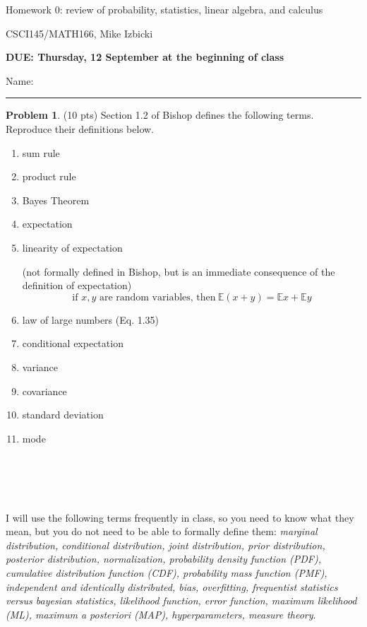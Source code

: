 \documentclass[10pt]{article}
\theoremstyle{definition}
\newtheorem{problem}{Problem}
\newcommand{\E}{\mathbb E}
\begin{document}
\begin{center}
    {
\Large
Homework 0: review of probability, statistics, linear algebra, and calculus
}

    \vspace{0.1in}
CSCI145/MATH166, Mike Izbicki

    \vspace{0.1in}
    \textbf{DUE: Thursday, 12 September at the beginning of class}

    \vspace{0.1in}
\end{center}

\vspace{0.25in}
\noindent
Name: 

\noindent
\rule{\textwidth}{0.1pt}
\vspace{0.25in}

\begin{problem}
    (10 pts)
    Section 1.2 of Bishop defines the following terms.
    Reproduce their definitions below.
    \begin{enumerate}
        \setlength\itemsep{8.0em}
        \item sum rule
        \item product rule
        \item Bayes Theorem
        \item expectation
        \item linearity of expectation 

            (not formally defined in Bishop, but is an immediate consequence of the definition of expectation)
            $$
            \text{if $x,y$ are random variables, then}~\E (x+y) = \E x + \E y
            $$
        \item law of large numbers (Eq. 1.35)
        \item conditional expectation
        \item variance 
        \item covariance 
        \item standard deviation
        \item mode
            \\
            \\
            \\
            \\
            \\
    \end{enumerate}

    I will use the following terms frequently in class, 
    so you need to know what they mean,
    but you do not need to be able to formally define them:
    \emph{marginal distribution, conditional distribution, joint distribution, prior distribution, posterior distribution, normalization, probability density function (PDF), cumulative distribution function (CDF), probability mass function (PMF), independent and identically distributed, bias, overfitting, frequentist statistics versus bayesian statistics, likelihood function, error function, maximum likelihood (ML), maximum a posteriori (MAP), hyperparameters, measure theory}.

\end{problem}
\end{document}
